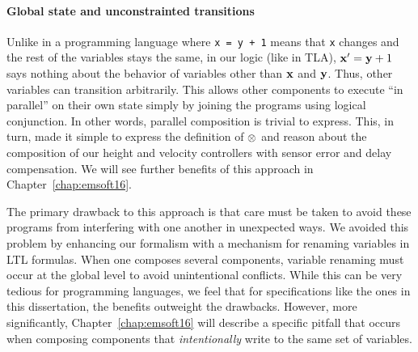 \paragraph*{Global state and unconstrainted transitions}
Unlike in a programming language where \texttt{x = y + 1} means that
\texttt{x} changes and the rest of the variables stays the same, in our
logic (like in TLA), $\mathbf{x}^\prime = \mathbf{y} + 1$ says nothing about
the behavior of variables other than $\mathbf{x}$ and $\mathbf{y}$. Thus,
other variables can transition arbitrarily.  This allows other components
to execute ``in parallel'' on their own state simply by joining the
programs using logical conjunction. In other words, parallel composition is
trivial to express. This, in turn, made it simple to express the definition
of $\SysConjoinP{}$ and reason about the composition of our height and
velocity controllers with sensor error and delay compensation. We will see
further benefits of this approach in Chapter~\ref{chap:emsoft16}.

The primary drawback to this approach is that care must be taken to avoid
these programs from interfering with one another in unexpected ways.  We
avoided this problem by enhancing our formalism with a mechanism for
renaming variables in LTL formulas. When one composes several components,
variable renaming must occur at the global level to avoid unintentional
conflicts. While this can be very tedious for programming languages, we
feel that for specifications like the ones in this dissertation, the
benefits outweight the drawbacks. However, more significantly,
Chapter~\ref{chap:emsoft16} will describe a specific pitfall that occurs
when composing components that \emph{intentionally} write to the same set
of variables.
